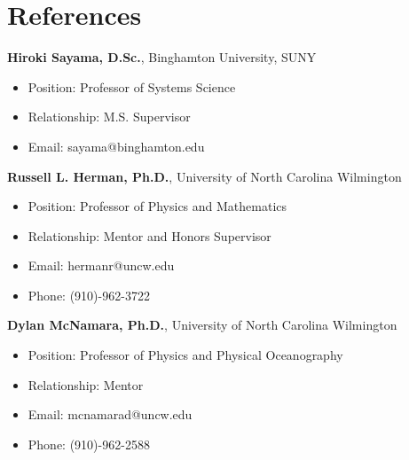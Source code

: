 \documentclass[12pt]{article}
\begin{document}
\section{References}
\textbf{Hiroki Sayama, D.Sc.}, Binghamton University, SUNY
\begin{itemize}
    \itemsep = 0em
    \item[] Position: Professor of Systems Science
    \item[] Relationship: M.S. Supervisor
    \item[] Email: sayama@binghamton.edu
\end{itemize}

\textbf{Russell L. Herman, Ph.D.}, University of North Carolina Wilmington
\begin{itemize}
    \itemsep = 0em
    \item[] Position: Professor of Physics and Mathematics
    \item[] Relationship: Mentor and Honors Supervisor
    \item[] Email: hermanr@uncw.edu
    \item[] Phone: (910)-962-3722
\end{itemize}

\textbf{Dylan McNamara, Ph.D.}, University of North Carolina Wilmington
\begin{itemize}
    \itemsep = 0em
    \item[] Position: Professor of Physics and Physical Oceanography
    \item[] Relationship: Mentor
    \item[] Email: mcnamarad@uncw.edu
    \item[] Phone: (910)-962-2588
\end{itemize}
\end{document}
